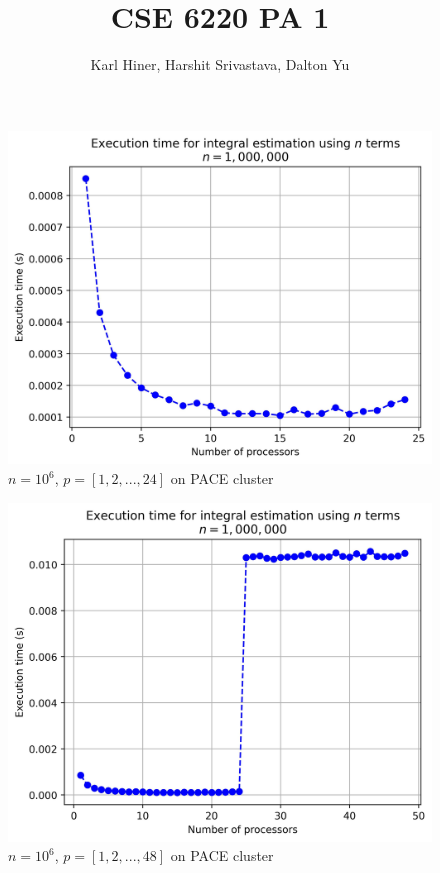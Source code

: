 \documentclass[twoside,10pt]{article}
\begin{document}
\title{CSE 6220 PA 1}
\author{Karl Hiner, Harshit Srivastava, Dalton Yu}
\date{}
\maketitle

\begin{figure}[htb]
    \centering \includegraphics[width=\textwidth]{report_chart_n_1M_PACE.jpg}
    \caption{$n=10^6$, $p=[1,2,...,24]$ on PACE cluster}
    \label{fig:figure1}
\end{figure}

\begin{figure}[htb]
    \centering \includegraphics[width=\textwidth]{report_chart_n_1M_p_48_PACE.jpg}
    \caption{$n=10^6$, $p=[1,2,...,48]$ on PACE cluster}
    \label{fig:figure2}
\end{figure}
  
\end{document}
